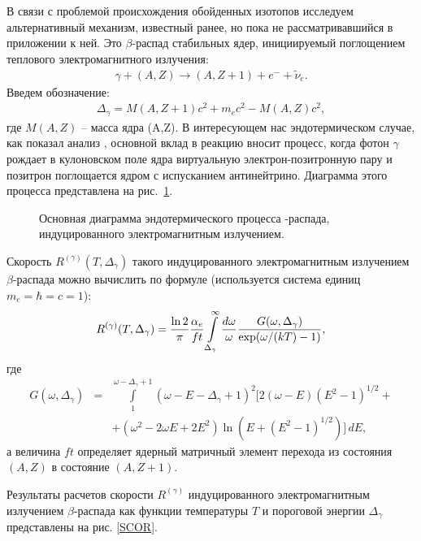 В связи с проблемой происхождения обойденных изотопов исследуем
альтернативный механизм, известный ранее, но пока не рассматривавшийся в приложении к ней.
Это $\beta$-распад стабильных ядер, инициируемый
поглощением теплового электромагнитного излучения:
\begin{eqnarray}\label{gamma}
\gamma+(A,Z) \to (A,Z+1)+e^- + \tilde \nu_e.
\end{eqnarray}
Введем обозначение:
\begin{eqnarray}\label{D_gamma}
\Delta_\gamma= M(A,Z+1)c^2 + m_e c^2 - M(A,Z) c^2,
\end{eqnarray}
где $M(A,Z)$ -- масса ядра (A,Z).
В интересующем нас эндотермическом случае, как показал анализ \cite{shaw},
основной вклад в реакцию вносит процесс,
когда фотон $\gamma$ рождает в кулоновском поле ядра виртуальную
электрон-позитронную пару и позитрон поглощается ядром с испусканием
антинейтрино. Диаграмма этого процесса представлена на рис.~\ref{DFOT}.
\begin{figure}
\vspace{5 true cm}
\caption{Основная диаграмма эндотермического процесса  \be-распада, индуцированного
электромагнитным излучением.}
\label{DFOT}
\end{figure}

Скорость $R^{(\gamma)}
(T,\Delta_\gamma)$ такого индуцированного электромагнитным излучением
$\beta$-распада можно вычислить по формуле \cite{shaw} (используется
система единиц  $m_e = \hbar = c = 1$):
\begin{eqnarray}\label{R_gamma}
R^{(\gamma)}(T,\Delta_\gamma)={{\ln 2}\over{\pi}}{{\alpha_e}\over{ft}}
\int\limits_{\Delta_\gamma}^\infty {{d\omega}\over{\omega}}{{G(\omega, \Delta_\gamma)}
\over{\exp({\omega/(kT)}-1)}},
\end{eqnarray}
где
\begin{eqnarray}\label{G}
G(\omega, \Delta_\gamma)&=&\int\limits_{1}^{\omega - \Delta_\gamma + 1}
(\omega-E- \Delta_\gamma +1)^2[2(\omega-E)(E^2-1)^{1/2} +\nonumber\\
&&+ (\omega^2-
2\omega E+2E^2)\ln(E+(E^2-1)^{1/2})]\,dE,
\end{eqnarray}
а величина $ft$ определяет ядерный матричный элемент перехода из состояния
$(A,Z)$ в состояние $(A,Z+1)$.

Результаты расчетов скорости $R^{(\gamma)}$  индуцированного
электромагнитным излучением $\beta$-распада
как функции температуры $T$ и
пороговой энергии $\Delta_\gamma$
представлены на рис. \ref{SCOR}.

